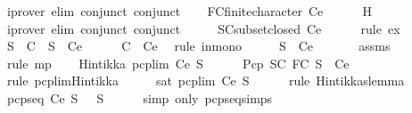 \begin{isabellebody}
\ {\isacharparenleft}iprover\ elim{\isacharcolon}\ conjunct{}\ conjunct{}{\isacharparenright}\isanewline
\ \ \isamarkupfalse%
\ FC{\isacharcolon}{\isachardoublequoteopen}finite{\isacharunderscore}character\ Ce{\isachardoublequoteclose}\isanewline
\ \ \ \ \isamarkupfalse%
\ H{}\ \isamarkupfalse%
\ {\isacharparenleft}iprover\ elim{\isacharcolon}\ conjunct{}\ conjunct{}{\isacharparenright}\isanewline
\ \ \isamarkupfalse%
\ \isamarkupfalse%
\ SC{\isacharcolon}{\isachardoublequoteopen}subset{\isacharunderscore}closed\ Ce{\isachardoublequoteclose}\isanewline
\ \ \ \ \isamarkupfalse%
\ {\isacharparenleft}rule\ ex{}{\isacharparenright}\isanewline
\ \ \isamarkupfalse%
\ {\isachardoublequoteopen}S\ {\isasymin}\ C\ {\isasymlongrightarrow}\ S\ {\isasymin}\ Ce{\isachardoublequoteclose}\isanewline
\ \ \ \ \isamarkupfalse%
\ {\isacartoucheopen}C\ {\isasymsubseteq}\ Ce{\isacartoucheclose}\ \isamarkupfalse%
\ {\isacharparenleft}rule\ in{\isacharunderscore}mono{\isacharparenright}\isanewline
\ \ \isamarkupfalse%
\ \isamarkupfalse%
\ {\isachardoublequoteopen}S\ {\isasymin}\ Ce{\isachardoublequoteclose}\ \isanewline
\ \ \ \ \isamarkupfalse%
\ assms{\isacharparenleft}{}{\isacharparenright}\ \isamarkupfalse%
\ {\isacharparenleft}rule\ mp{\isacharparenright}\isanewline
\ \ \isamarkupfalse%
\ {\isachardoublequoteopen}Hintikka\ {\isacharparenleft}pcp{\isacharunderscore}lim\ Ce\ S{\isacharparenright}{\isachardoublequoteclose}\isanewline
\ \ \ \ \isamarkupfalse%
\ Pcp\ SC\ FC\ {\isacartoucheopen}S\ {\isasymin}\ Ce{\isacartoucheclose}\ \isamarkupfalse%
\ {\isacharparenleft}rule\ pcp{\isacharunderscore}lim{\isacharunderscore}Hintikka{\isacharparenright}\isanewline
\ \ \isamarkupfalse%
\ \isamarkupfalse%
\ {\isachardoublequoteopen}sat\ {\isacharparenleft}pcp{\isacharunderscore}lim\ Ce\ S{\isacharparenright}{\isachardoublequoteclose}\isanewline
\ \ \ \ \isamarkupfalse%
\ {\isacharparenleft}rule\ Hintikkaslemma{\isacharparenright}\isanewline
\ \ \isamarkupfalse%
\ {\isachardoublequoteopen}pcp{\isacharunderscore}seq\ Ce\ S\ {}\ {\isacharequal}\ S{\isachardoublequoteclose}\isanewline
\ \ \ \ \isamarkupfalse%
\ {\isacharparenleft}simp\ only{\isacharcolon}\ pcp{\isacharunderscore}seq{\isachardot}simps{\isacharparenleft}{}{\isacharparenright}{\isacharparenright}\isanewline

\end{isabellebody}
